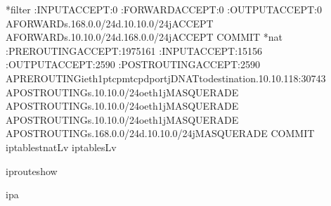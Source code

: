 \documentclass[letterpaper,10pt,english]{sphinxmanual}
\begin{document}
\begin{sphinxVerbatim}[commandchars=\\\{\}]
*filter
:INPUTACCEPT\PYG{o}{[}:0\PYG{o}{]}
:FORWARDACCEPT\PYG{o}{[}:0\PYG{o}{]}
:OUTPUTACCEPT\PYG{o}{[}:0\PYG{o}{]}
\PYGZhy{}AFORWARD\PYGZhy{}s.168.0.0/24\PYGZhy{}d.10.10.0/24\PYGZhy{}jACCEPT
\PYGZhy{}AFORWARD\PYGZhy{}s.10.10.0/24\PYGZhy{}d.168.0.0/24\PYGZhy{}jACCEPT
COMMIT
*nat
:PREROUTINGACCEPT\PYG{o}{[}:1975161\PYG{o}{]}
:INPUTACCEPT\PYG{o}{[}:15156\PYG{o}{]}
:OUTPUTACCEPT\PYG{o}{[}:2590\PYG{o}{]}
:POSTROUTINGACCEPT\PYG{o}{[}:2590\PYG{o}{]}
\PYGZhy{}APREROUTING\PYGZhy{}ieth1\PYGZhy{}ptcp\PYGZhy{}mtcp\PYGZhy{}\PYGZhy{}dport\PYGZhy{}jDNAT\PYGZhy{}\PYGZhy{}to\PYGZhy{}destination.10.10.118:30743
\PYGZhy{}APOSTROUTING\PYGZhy{}s.10.10.0/24\PYGZhy{}oeth1\PYGZhy{}jMASQUERADE
\PYGZhy{}APOSTROUTING\PYGZhy{}s.10.10.0/24\PYGZhy{}oeth1\PYGZhy{}jMASQUERADE
\PYGZhy{}APOSTROUTING\PYGZhy{}s.10.10.0/24\PYGZhy{}oeth1\PYGZhy{}jMASQUERADE
\PYGZhy{}APOSTROUTING\PYGZhy{}s.168.0.0/24\PYGZhy{}d.10.10.0/24\PYGZhy{}jMASQUERADE
COMMIT
iptables\PYGZhy{}tnat\PYGZhy{}L\PYGZhy{}v
iptables\PYGZhy{}L\PYGZhy{}v

iprouteshow

ipa
\end{sphinxVerbatim}
\end{document}
